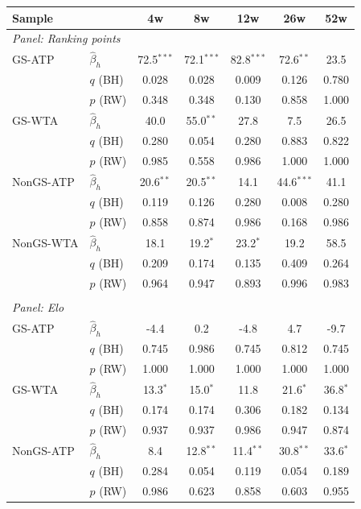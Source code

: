 \begin{tabular}{ll*{5}{c}}
\toprule
Sample & & 4w & 8w & 12w & 26w & 52w \\
\midrule
\multicolumn{7}{l}{\textit{Panel: Ranking points}} \\ \midrule
GS-ATP & $\hat{\beta}_h$ & 72.5$^{***}$ & 72.1$^{***}$ & 82.8$^{***}$ & 72.6$^{**}$ & 23.5 \\
 & $q$ (BH) & 0.028 & 0.028 & 0.009 & 0.126 & 0.780 \\
 & $p$ (RW) & 0.348 & 0.348 & 0.130 & 0.858 & 1.000 \\[0.2em]
GS-WTA & $\hat{\beta}_h$ & 40.0 & 55.0$^{**}$ & 27.8 & 7.5 & 26.5 \\
 & $q$ (BH) & 0.280 & 0.054 & 0.280 & 0.883 & 0.822 \\
 & $p$ (RW) & 0.985 & 0.558 & 0.986 & 1.000 & 1.000 \\[0.2em]
NonGS-ATP & $\hat{\beta}_h$ & 20.6$^{**}$ & 20.5$^{**}$ & 14.1 & 44.6$^{***}$ & 41.1 \\
 & $q$ (BH) & 0.119 & 0.126 & 0.280 & 0.008 & 0.280 \\
 & $p$ (RW) & 0.858 & 0.874 & 0.986 & 0.168 & 0.986 \\[0.2em]
NonGS-WTA & $\hat{\beta}_h$ & 18.1 & 19.2$^{*}$ & 23.2$^{*}$ & 19.2 & 58.5 \\
 & $q$ (BH) & 0.209 & 0.174 & 0.135 & 0.409 & 0.264 \\
 & $p$ (RW) & 0.964 & 0.947 & 0.893 & 0.996 & 0.983 \\[0.2em]
\\[0.3em]
\multicolumn{7}{l}{\textit{Panel: Elo}} \\ \midrule
GS-ATP & $\hat{\beta}_h$ & -4.4 & 0.2 & -4.8 & 4.7 & -9.7 \\
 & $q$ (BH) & 0.745 & 0.986 & 0.745 & 0.812 & 0.745 \\
 & $p$ (RW) & 1.000 & 1.000 & 1.000 & 1.000 & 1.000 \\[0.2em]
GS-WTA & $\hat{\beta}_h$ & 13.3$^{*}$ & 15.0$^{*}$ & 11.8 & 21.6$^{*}$ & 36.8$^{*}$ \\
 & $q$ (BH) & 0.174 & 0.174 & 0.306 & 0.182 & 0.134 \\
 & $p$ (RW) & 0.937 & 0.937 & 0.986 & 0.947 & 0.874 \\[0.2em]
NonGS-ATP & $\hat{\beta}_h$ & 8.4 & 12.8$^{**}$ & 11.4$^{**}$ & 30.8$^{**}$ & 33.6$^{*}$ \\
 & $q$ (BH) & 0.284 & 0.054 & 0.119 & 0.054 & 0.189 \\
 & $p$ (RW) & 0.986 & 0.623 & 0.858 & 0.603 & 0.955 \\[0.2em]

\end{tabular}
